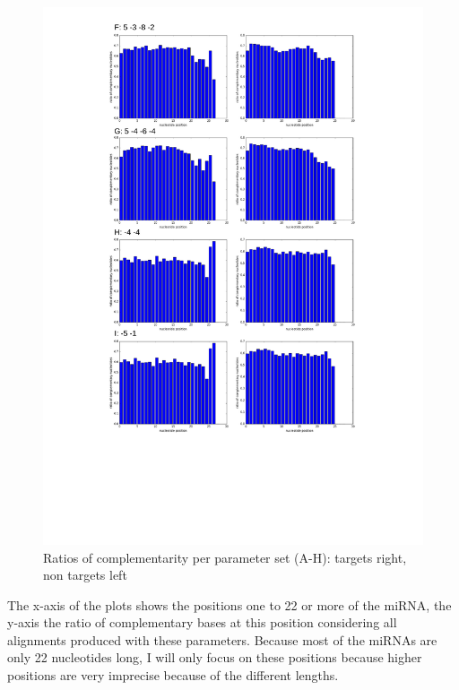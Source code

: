 \documentclass[12pt]{article}
\begin{document}
\begin{figure}
\includegraphics[scale=0.65]{results/combined_results2.pdf}
\vspace{-4cm}
\caption{Ratios of complementarity per parameter set (A-H): targets right, non targets left}
\label{ratios}
\end{figure}

The x-axis of the plots shows the positions one to 22 or more of the miRNA, the y-axis the ratio of complementary bases at this position considering all alignments produced with these parameters. Because most of the miRNAs are only 22 nucleotides long, I will only focus on these positions because higher positions are very imprecise because of the different lengths.
\end{document}
